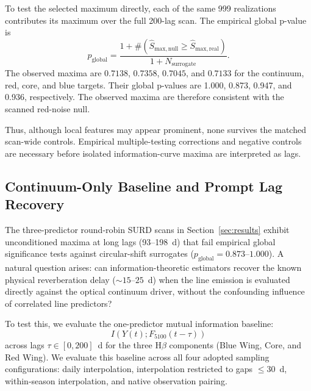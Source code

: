 \documentclass[fleqn,usenatbib]{mnras}
\begin{document}
To test the selected maximum directly, each of the same 999 realizations contributes its maximum over the full 200-lag scan. The empirical global p-value is
\begin{equation}
p_{\mathrm{global}} = \frac{1 + \#(\widehat{S}_{\mathrm{max, null}} \ge \widehat{S}_{\mathrm{max, real}})}{1 + N_{\mathrm{surrogate}}}.
\end{equation}
The observed maxima are $0.7138$, $0.7358$, $0.7045$, and $0.7133$ for the continuum, red, core, and blue targets. Their global p-values are 1.000, 0.873, 0.947, and 0.936, respectively. The observed maxima are therefore consistent with the scanned red-noise null.

Thus, although local features may appear prominent, none survives the matched scan-wide controls. Empirical multiple-testing corrections and negative controls are necessary before isolated information-curve maxima are interpreted as lags.

\subsection{Continuum-Only Baseline and Prompt Lag Recovery}
\label{sec:continuum_baseline}

The three-predictor round-robin SURD scans in Section~\ref{sec:results} exhibit unconditioned maxima at long lags (93--198~d) that fail empirical global significance tests against circular-shift surrogates ($p_{\mathrm{global}} = 0.873$--$1.000$). A natural question arises: can information-theoretic estimators recover the known physical reverberation delay ($\sim 15$--$25$~d) when the line emission is evaluated directly against the optical continuum driver, without the confounding influence of correlated line predictors?

To test this, we evaluate the one-predictor mutual information baseline:
\begin{equation}
I(Y(t); F_{5100}(t - \tau))
\end{equation}
across lags $\tau \in [0, 200]$~d for the three H\(\beta\) components (Blue Wing, Core, and Red Wing). We evaluate this baseline across all four adopted sampling configurations: daily interpolation, interpolation restricted to gaps $\le 30$~d, within-season interpolation, and native observation pairing.
\end{document}
